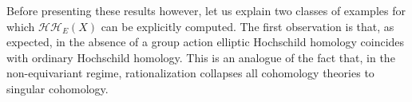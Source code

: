 \documentclass[11pt,letterpaper]{amsart}
\newcommand{\cO}{\mathcal{O}}
\newcommand{\cL}{\mathcal{L}}
\begin{document}
 
Before presenting these results however,   let us explain  two classes of examples for which $\mathcal{HH}_E(X)$ can be explicitly computed. 
 The first  observation is that, as expected, in the absence of a group action elliptic Hochschild homology coincides with ordinary Hochschild homology. This is an analogue of the fact that, in the non-equivariant regime, rationalization collapses all cohomology theories to singular cohomology.   
 
\end{document}
